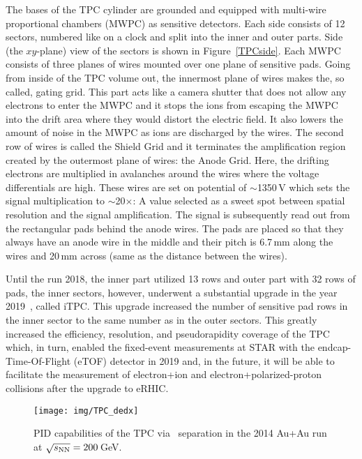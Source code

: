 The bases of the TPC cylinder are grounded and equipped with multi-wire proportional chambers
(MWPC) as sensitive detectors. Each side consists of 12 sectors, numbered like on a clock and split into 
the inner and outer parts. Side (the $xy$-plane) view of the sectors is shown in Figure~\ref{TPCside}\@. Each MWPC consists of three planes of wires mounted over one plane of sensitive pads. Going from inside of the TPC volume out, the innermost plane of wires makes the, so called, gating grid. This part acts like a camera shutter that does not allow any electrons to enter the MWPC and it stops the ions from escaping the MWPC into the drift area where they would distort the electric field. It also lowers the amount of noise in the MWPC as ions are discharged by the wires. The second row of wires is called the Shield Grid and it terminates the amplification region created by the outermost plane of wires: the Anode Grid. Here, the drifting electrons are multiplied in avalanches around the wires where the voltage differentials are high. These wires are set on potential of $\sim$1350$\,$V which sets the signal multiplication to $\sim$20$\times$\@: A value selected as a sweet spot between spatial resolution and the signal amplification. The signal is subsequently read out from the rectangular pads behind the anode wires. The pads are placed so that they always have an anode wire in the middle and their pitch is 6.7$\,$mm along the wires and 20$\,$mm across (same as the distance between the wires). 

Until the run 2018, the inner part utilized 13 rows and outer part with 32 rows of pads, the inner sectors, however, underwent a substantial 
upgrade in the year 2019~\cite{iTPC}, called iTPC\@. This upgrade increased the number of sensitive pad rows in the inner sector to the same number as in the outer sectors. This greatly
increased the efficiency, resolution, and pseudorapidity coverage of the TPC which, in turn, enabled the fixed-event measurements at STAR with the endcap-Time-Of-Flight (eTOF) detector in 2019 and, in the future, it will be able to facilitate the measurement of electron+ion and electron+polarized-proton collisions after the upgrade to eRHIC\@. 

\begin{figure}[!htb]
\begin{center}
 \texttt{[image: img/TPC\_dedx]}\\
\end{center}
\caption[PID capabilities of the TPC via \dedx\ separation in the 2014 Au+Au run at $\snn = 200\,$GeV\@.]{\label{TpcPid}PID capabilities of the TPC via \dedx\ separation in the 2014 Au+Au run at $\snn = 200\,$GeV\@.}
\end{figure}


